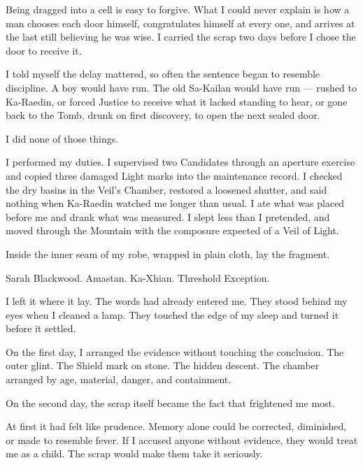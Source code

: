 
Being dragged into a cell is easy to forgive. What I could never explain is how a man chooses each door himself, congratulates himself at every one, and arrives at the last still believing he was wise. I carried the scrap two days before I chose the door to receive it.\par

\ornament

I told myself the delay mattered, so often the sentence began to resemble discipline. A boy would have run. The old Sa-Kailan would have run --- rushed to Ka-Raedin, or forced Justice to receive what it lacked standing to hear, or gone back to the Tomb, drunk on first discovery, to open the next sealed door.\par

I did none of those things.\par

I performed my duties. I supervised two Candidates through an aperture exercise and copied three damaged Light marks into the maintenance record. I checked the dry basins in the Veil's Chamber, restored a loosened shutter, and said nothing when Ka-Raedin watched me longer than usual. I ate what was placed before me and drank what was measured. I slept less than I pretended, and moved through the Mountain with the composure expected of a Veil of Light.\par

Inside the inner seam of my robe, wrapped in plain cloth, lay the fragment.\par

Sarah Blackwood. Amastan. Ka-Xhian. Threshold Exception.\par

I left it where it lay. The words had already entered me. They stood behind my eyes when I cleaned a lamp. They touched the edge of my sleep and turned it before it settled.\par

On the first day, I arranged the evidence without touching the conclusion. The outer glint. The Shield mark on stone. The hidden descent. The chamber arranged by age, material, danger, and containment.\par

On the second day, the scrap itself became the fact that frightened me most.\par

At first it had felt like prudence. Memory alone could be corrected, diminished, or made to resemble fever. If I accused anyone without evidence, they would treat me as a child. The scrap would make them take it seriously.\par

